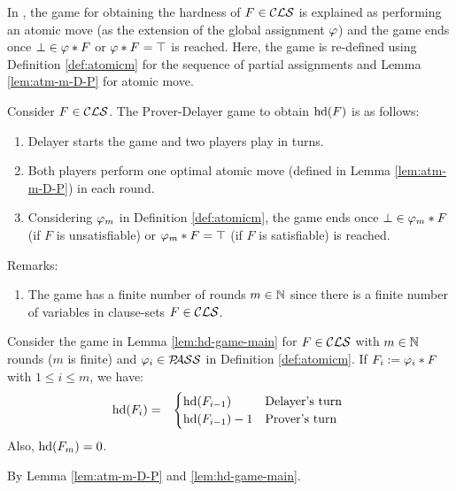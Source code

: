 \documentclass{report}
\begin{document}
In \cite{BeyersdorffKullmann2014PHP}, the game for obtaining the hardness of $F \in \mathcal{CLS}$ is explained as performing an atomic move (as the extension of the global assignment $\varphi$) and the game ends once $\bot \in \varphi * F $ or $\varphi * F=\top$ is reached. Here, the game is re-defined using Definition \ref{def:atomicm} for the sequence of partial assignments and Lemma \ref{lem:atm-m-D-P} for atomic move.

\begin{lem}\label{lem:hd-game-main}
Consider $F \in \mathcal{CLS}$. The Prover-Delayer game to obtain $\operatorname{hd}(F)$ is as follows:
  \begin{enumerate}
  \item Delayer starts the game and two players play in turns.
  \item Both players perform one optimal atomic move (defined in Lemma \ref{lem:atm-m-D-P}) in each round.
  \item Considering $\varphi_m$ in Definition \ref{def:atomicm}, the game ends once $\bot \in \varphi_m * F $ (if $F$ is unsatisfiable) or $\varphi_m * F=\top$ (if $F$ is satisfiable) is reached. 
  \end{enumerate}
\end{lem}
Remarks:
  \begin{enumerate}
  \item The game has a finite number of rounds $m \in \mathbb{N}$ since there is a finite number of variables in clause-sets $F \in \mathcal{CLS}$. 
  \end{enumerate}

\begin{lem}\label{lem:hdchg}
Consider the game in Lemma \ref{lem:hd-game-main} for $F \in \mathcal{CLS}$ with $m \in  \mathbb{N}$ rounds ($m$ is finite) and $\varphi_i \in \mathcal{P\hspace{-0.32em}ASS}$ in Definition \ref{def:atomicm}. If $F_i:= \varphi_i * F$ with $1 \le i \le m$, we have:
  \begin{eqnarray*}
  \operatorname{hd}(F_i) & = &
  \begin{cases}
  \operatorname{hd}(F_{i-1}) & \text{Delayer's turn }\\ \operatorname{hd}(F_{i-1})-1 & \text{Prover's turn}
  \end{cases}
  \end{eqnarray*}
Also, $\operatorname{hd}(F_m)=0$.
\end{lem}
\begin{prf}
By Lemma \ref{lem:atm-m-D-P} and \ref{lem:hd-game-main}.
\end{prf}
\end{document}
